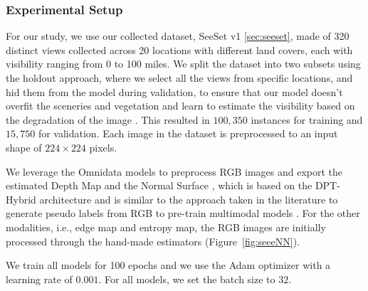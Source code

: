\subsubsection{Experimental Setup}
For our study, we use our collected dataset, SeeSet v1 \ref{sec:seeset}, made of 320 distinct views collected across 20 locations with different land covers, each with visibility ranging from 0 to 100 miles. We split the dataset into two subsets using the holdout approach, where we select all the views from specific locations, and hid them from the model during validation, to ensure that our model doesn't overfit the sceneries and vegetation and learn to estimate the visibility based on the degradation of the image \cite{Bouhsine2022}. This resulted in $100,350$ instances for training and $15,750$ for validation. Each image in the dataset is preprocessed to an input shape of $224 \times 224$ pixels.

We leverage the Omnidata models to preprocess RGB images and export the estimated Depth Map and the Normal Surface \cite{eftekhar2021omnidata}, which is based on the DPT-Hybrid architecture \cite{ranftl2021vision} and is similar to the approach taken in the literature to generate pseudo labels from RGB to pre-train multimodal models \cite{bachmann2022multimae, wang2024largescale}. 
For the other modalities, i.e., edge map and entropy map, the RGB images are initially processed through the hand-made estimators (Figure~\ref{fig:seeeNN}).

We train all models for 100 epochs and we use the Adam optimizer with a learning rate of $0.001$. For all models, we set the batch size to $32$.
